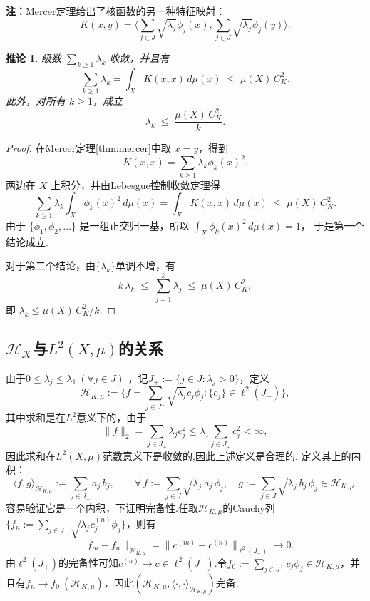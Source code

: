 \documentclass[12pt, a4paper, oneside]{ctexbook}
\newtheorem{corollary}[theorem]{推论}
\begin{document}
\noindent\textbf{注：}Mercer定理给出了核函数的另一种特征映射：
\begin{equation*}
    K(x,y) =\langle \sum_{j\in J}\sqrt{\lambda_j}\phi_j(x),\sum_{j\in J}\sqrt{\lambda_j}\phi_j(y)\rangle.
\end{equation*}



\begin{corollary}
级数 $\sum_{k\geq 1}\lambda_k$ 收敛，并且有
\[
\sum_{k\geq 1}\lambda_k
= \int_X K(x,x)\,d\mu(x)
\;\leq\; \mu(X)\,C_K^2.
\]
此外，对所有 $k\geq 1$，成立
\[
\lambda_k \;\leq\; \frac{\mu(X)\,C_K^2}{k}.
\]
\end{corollary}

\begin{proof}
在Mercer定理\ref{thm:mercer}中取 $x=y$，得到
\[
K(x,x)=\sum_{k\geq 1}\lambda_k \phi_k(x)^2.
\]
两边在 $X$ 上积分，并由Lebesgue控制收敛定理得
\[
\sum_{k\geq 1}\lambda_k\int_X \phi_k(x)^2\,d\mu(x)
=\int_X K(x,x)\,d\mu(x)
\;\leq\;\mu(X)\,C_K^2.
\]
由于 $\{\phi_1,\phi_2,\dots\}$ 是一组正交归一基，所以
\(\int_X \phi_k(x)^2\,d\mu(x)=1\)，
于是第一个结论成立.

对于第二个结论，由$\{\lambda_k\}$单调不增，有
\[
k\,\lambda_k \;\leq\;\sum_{j=1}^k \lambda_j
\;\leq\;\mu(X)\,C_K^2,
\]
即
\(\lambda_k \leq \mu(X)\,C_K^2/k\).
\end{proof}



\subsection{$\mathcal{H_K}$与$L^2(X,\mu)$的关系}
由于$0\leq \lambda_j\leq \lambda_1~(\forall j\in J)$
，记$J_+:=\{j\in J:\lambda_j>0\}$，定义
\begin{equation*}
    \mathcal{H}_{K,\mu}:=\{f=\sum_{j\in J^+}\sqrt{\lambda_j}c_j\phi_j:\{c_j\}\in\ell^2(J_+)\},
\end{equation*}
其中求和是在$L^2$意义下的，由于
\begin{equation*}
    \|f\|_2 = \sum_{j\in J_+}\lambda_j c_j^2\leq \lambda_1\sum_{j\in J_+}c_j^2<\infty,
\end{equation*}
因此求和在$L^2(X,\mu)$范数意义下是收敛的,因此上述定义是合理的. 定义其上的内积：
\begin{equation}\label{eq: H_Kmu 内积}
    \langle f , g \rangle_{\mathcal{H}_{K,\mu}}
:= \sum_{j\in J_+} a_j\,b_j,
\qquad
\forall\, 
f := \sum_{j\in J} \sqrt{\lambda_j}\, a_j\, \phi_j,\quad
g := \sum_{j\in J} \sqrt{\lambda_j}\, b_j\, \phi_j \in \mathcal{H}_{K,\mu}.
\end{equation}
容易验证它是一个内积，下证明完备性.任取$\mathcal{H}_{K,\mu}$的Cauchy列$\{f_n:=\sum_{j\in J_+}\sqrt{\lambda_j}c^{(n)}_j\phi_j\}$，则有
\begin{equation*}
    \|f_m - f_n\|_{\mathcal{H}_{K,\mu}} = \|c^{(m)}-c^{(n)}\|_{\ell^2(J_+)}\to 0.
\end{equation*}
由$\ell^2(J_+)$的完备性可知$c^{(n)}\to c\in\ell^2(J_+).$令$f_0:=\sum_{j\in J^+}c_j\phi_j\in\mathcal{H}_{K,\mu}$，并且有$f_n\to f_0~(\mathcal{H}_{K,\mu})$，因此$\left(\mathcal{H}_{K,\mu},\langle\cdot,\cdot\rangle_{\mathcal{H}_{K,\mu}}\right)$完备.
\end{document}
